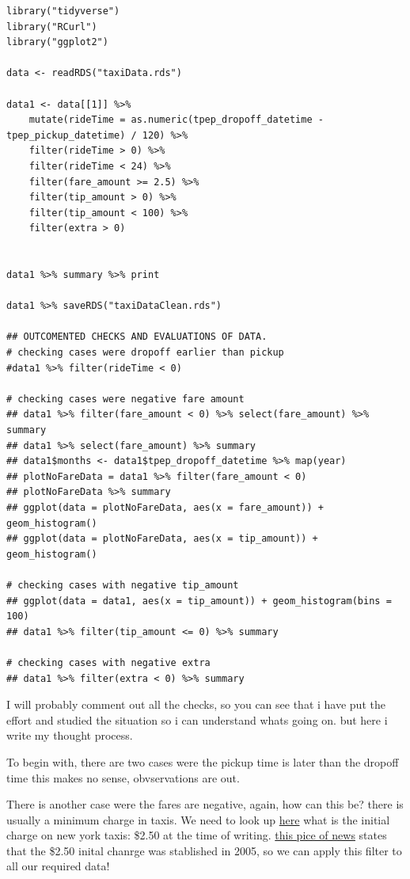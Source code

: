 \documentclass[11pt]{article}
\begin{document}
\begin{verbatim}
library("tidyverse")
library("RCurl")
library("ggplot2")

data <- readRDS("taxiData.rds")

data1 <- data[[1]] %>%
    mutate(rideTime = as.numeric(tpep_dropoff_datetime - tpep_pickup_datetime) / 120) %>%
    filter(rideTime > 0) %>%
    filter(rideTime < 24) %>%
    filter(fare_amount >= 2.5) %>%
    filter(tip_amount > 0) %>%
    filter(tip_amount < 100) %>%
    filter(extra > 0)


data1 %>% summary %>% print

data1 %>% saveRDS("taxiDataClean.rds")

## OUTCOMENTED CHECKS AND EVALUATIONS OF DATA.
# checking cases were dropoff earlier than pickup
#data1 %>% filter(rideTime < 0)

# checking cases were negative fare amount
## data1 %>% filter(fare_amount < 0) %>% select(fare_amount) %>% summary
## data1 %>% select(fare_amount) %>% summary
## data1$months <- data1$tpep_dropoff_datetime %>% map(year)
## plotNoFareData = data1 %>% filter(fare_amount < 0)
## plotNoFareData %>% summary
## ggplot(data = plotNoFareData, aes(x = fare_amount)) + geom_histogram()
## ggplot(data = plotNoFareData, aes(x = tip_amount)) + geom_histogram()

# checking cases with negative tip_amount
## ggplot(data = data1, aes(x = tip_amount)) + geom_histogram(bins = 100)
## data1 %>% filter(tip_amount <= 0) %>% summary

# checking cases with negative extra
## data1 %>% filter(extra < 0) %>% summary
\end{verbatim}
I will probably comment out all the checks, so you can see that i have put the effort
and studied the situation so i can understand whats going on. but here i write my
thought process.

To begin with, there are two cases were the pickup time is later than the dropoff time
this makes no sense, obvservations are out.

There is another case were the fares are negative, again, how can this be? there is usually
a minimum charge in taxis. We need to look up \href{https://www1.nyc.gov/site/tlc/passengers/taxi-fare.page}{here} what
is the initial charge on new york taxis: \$2.50 at the time of writing.
\href{https://nymag.com/nymetro/urban/features/taxi/n\_20286/}{this pice of news} states that the \$2.50 inital chanrge was stablished in 2005, so we can
apply this filter to all our required data!
\end{document}
